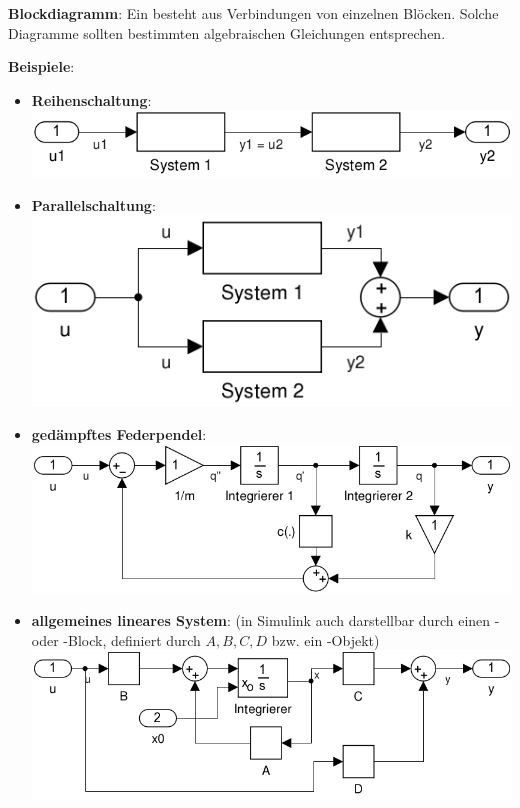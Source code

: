 \linie

\textbf{Blockdiagramm}:
Ein  besteht aus Verbindungen von einzelnen Blöcken.
Solche Diagramme sollten bestimmten algebraischen Gleichungen entsprechen.

\textbf{Beispiele}:
\begin{itemize}
    \item
    \textbf{Reihenschaltung}:\\
    \includegraphics[scale=\modelscale]{schaltung_reihe.png}

    \item
    \textbf{Parallelschaltung}:\\
    \includegraphics[scale=\modelscale]{schaltung_parallel.png}

    \item
    \textbf{gedämpftes Federpendel}:\\
    \includegraphics[scale=\modelscale]{federpendel_gedaempft.png}

    \item
    \textbf{allgemeines lineares System}:
    (in Simulink auch darstellbar durch einen - oder -Block,
    definiert durch $A, B, C, D$ bzw. ein -Objekt)\\
    \includegraphics[scale=\modelscale]{lineares_system.png}
\end{itemize}

\pagebreak
